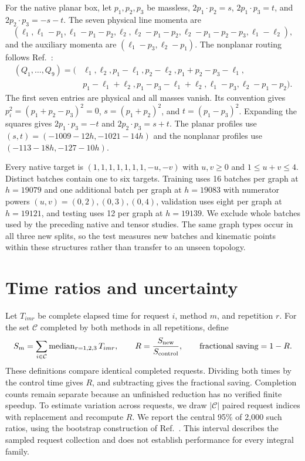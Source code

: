 For the native planar box, let $p_1,p_2,p_3$ be massless, $2p_1\cdot p_2=s$, $2p_1\cdot p_3=t$, and $2p_2\cdot p_3=-s-t$. The seven physical line momenta are
\begin{equation}
 (\ell_1,\ell_1-p_1,\ell_1-p_1-p_2,\ell_2,
 \ell_2-p_1-p_2,\ell_2-p_1-p_2-p_3,\ell_1-\ell_2),
 \label{eq:planar-input}
\end{equation}
and the auxiliary momenta are $(\ell_1-p_3,\ell_2-p_1)$. The nonplanar routing follows Ref.~\cite{KiraOriginal}:
\begin{align}
 (Q_1,\ldots,Q_9)=(&\ell_1,\ell_2,p_1-\ell_1,p_2-\ell_2,
 p_1+p_2-p_3-\ell_1,\nonumber\\
 &p_1-\ell_1+\ell_2,p_1-p_3-\ell_1+\ell_2,
 \ell_1-p_3,\ell_2-p_1-p_2).
 \label{eq:nonplanar-input}
\end{align}
The first seven entries are physical and all masses vanish. Its convention gives $p_i^2=(p_1+p_2-p_3)^2=0$, $s=(p_1+p_2)^2$, and $t=(p_1-p_3)^2$. Expanding the squares gives $2p_1\cdot p_3=-t$ and $2p_2\cdot p_3=s+t$. The planar profiles use $(s,t)=(-1009-12h,-1021-14h)$ and the nonplanar profiles use $(-113-18h,-127-10h)$.

Every native target is $(1,1,1,1,1,1,1,-u,-v)$ with $u,v\geq0$ and $1\leq u+v\leq4$. Distinct batches contain one to six targets. Training uses 16 batches per graph at $h=19079$ and one additional batch per graph at $h=19083$ with numerator powers $(u,v)=(0,2),(0,3),(0,4)$, validation uses eight per graph at $h=19121$, and testing uses 12 per graph at $h=19139$. We exclude whole batches used by the preceding native and tensor studies. The same graph types occur in all three new splits, so the test measures new batches and kinematic points within these structures rather than transfer to an unseen topology.

\section{Time ratios and uncertainty}
\label{app:statistics}
Let $T_{imr}$ be complete elapsed time for request $i$, method $m$, and repetition $r$. For the set $\mathcal C$ completed by both methods in all repetitions, define
\begin{equation}
 S_m=\sum_{i\in\mathcal C}\operatorname{median}_{r=1,2,3}T_{imr},\qquad
 R=\frac{S_{\rm new}}{S_{\rm control}},\qquad
 \text{fractional saving}=1-R.
 \label{eq:time-ratio}
\end{equation}
These definitions compare identical completed requests. Dividing both times by the control time gives $R$, and subtracting gives the fractional saving. Completion counts remain separate because an unfinished reduction has no verified finite speedup. To estimate variation across requests, we draw $|\mathcal C|$ paired request indices with replacement and recompute $R$. We report the central 95\% of 2,000 such ratios, using the bootstrap construction of Ref.~\cite{Efron1979}. This interval describes the sampled request collection and does not establish performance for every integral family.
